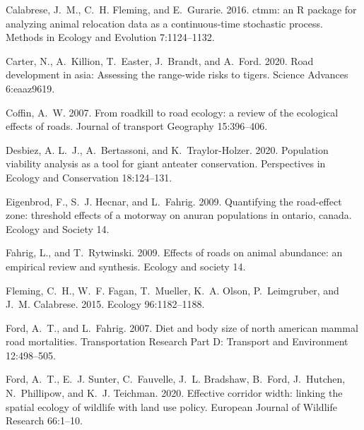 \documentclass[11pt]{article}
\begin{document}
\begin{thebibliography}{40}
Calabrese, J.~M., C.~H. Fleming, and E.~Gurarie. 2016.
\newblock ctmm: an {R} package for analyzing animal relocation data as a
  continuous-time stochastic process.
\newblock Methods in Ecology and Evolution 7:1124--1132.

Carter, N., A.~Killion, T.~Easter, J.~Brandt, and A.~Ford. 2020.
\newblock Road development in asia: Assessing the range-wide risks to tigers.
\newblock Science Advances 6:eaaz9619.

Coffin, A.~W. 2007.
\newblock From roadkill to road ecology: a review of the ecological effects of
  roads.
\newblock Journal of transport Geography 15:396--406.

Desbiez, A. L.~J., A.~Bertassoni, and K.~Traylor-Holzer. 2020.
\newblock Population viability analysis as a tool for giant anteater
  conservation.
\newblock Perspectives in Ecology and Conservation 18:124--131.

Eigenbrod, F., S.~J. Hecnar, and L.~Fahrig. 2009.
\newblock Quantifying the road-effect zone: threshold effects of a motorway on
  anuran populations in ontario, canada.
\newblock Ecology and Society 14.

Fahrig, L., and T.~Rytwinski. 2009.
\newblock Effects of roads on animal abundance: an empirical review and
  synthesis.
\newblock Ecology and society 14.

Fleming, C.~H., W.~F. Fagan, T.~Mueller, K.~A. Olson, P.~Leimgruber, and J.~M.
  Calabrese. 2015.
\newblock Ecology 96:1182--1188.

Ford, A.~T., and L.~Fahrig. 2007.
\newblock Diet and body size of north american mammal road mortalities.
\newblock Transportation Research Part D: Transport and Environment
  12:498--505.

Ford, A.~T., E.~J. Sunter, C.~Fauvelle, J.~L. Bradshaw, B.~Ford, J.~Hutchen,
  N.~Phillipow, and K.~J. Teichman. 2020.
\newblock Effective corridor width: linking the spatial ecology of wildlife
  with land use policy.
\newblock European Journal of Wildlife Research 66:1--10.


\end{thebibliography}
\end{document}
